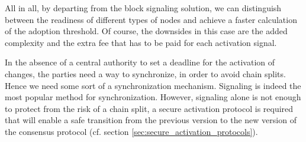 All in all, by departing from the block signaling solution, we can distinguish between the readiness of different types of nodes and achieve a faster calculation of the adoption threshold. Of course, the downsides in this case are the  added complexity and the extra fee that has to be paid for each activation signal.

In the absence of a central authority to set a deadline for the activation of 
changes, the parties need a way to synchronize, in order to avoid chain splits. 
Hence we need some sort of a synchronization mechanism. Signaling is indeed the 
most popular method for synchronization. However, signaling alone is not enough 
to protect from the risk of a chain split, a secure activation protocol is 
required that will enable a safe transition from  the previous version to the 
new 
version of the consensus protocol (cf. section 
\ref{sec:secure_activation_protocols}). 


